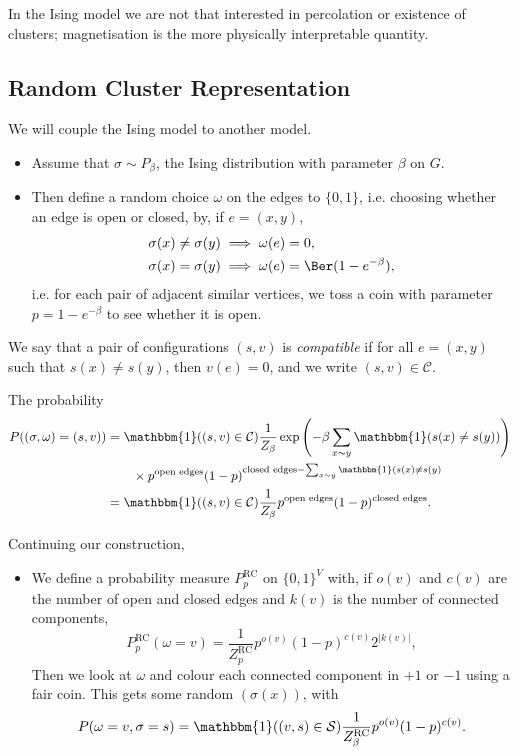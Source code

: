 \documentclass[12pt]{article}
\begin{document}

In the Ising model we are not that interested in percolation or existence of clusters; magnetisation is the more physically interpretable quantity.

\subsection{Random Cluster Representation}%
\label{sub:rcr}

We will couple the Ising model to another model.
\begin{itemize}
	\item Assume that $\sigma \sim P_\beta$, the Ising distribution with parameter $\beta$ on $G$.
	\item Then define a random choice $\omega$ on the edges to $\{0, 1\}$, i.e. choosing whether an edge is open or closed, by, if $e = (x, y)$,
		\begin{align*}
			\sigma(x) \neq \sigma(y) &\implies \omega(e) = 0, \\
		\sigma(x) = \sigma(y) &\implies \omega(e) = \Ber(1 - e^{-\beta}),
		\end{align*}
		i.e. for each pair of adjacent similar vertices, we toss a coin with parameter $p = 1 - e^{-\beta}$ to see whether it is open.
\end{itemize}

We say that a pair of configurations $(s, v)$ is \emph{compatible} if for all $e = (x, y)$ such that $s(x) \neq s(y)$, then $v(e) = 0$, and we write $(s, v) \in \mathcal{C}$.

The probability
\begin{align*}
	P((\sigma, \omega) = (s, v)) &= \mathbbm{1}((s, v) \in \mathcal{C}) \frac{1}{Z_\beta} \exp \left( - \beta \sum_{x \sim y} \mathbbm{1}(s(x) \neq s(y)) \right) \\
				     & \qquad \times p^{\text{open edges}} (1-p)^{\text{closed edges} - \sum_{x \sim y} \mathbbm{1}(s(x) \neq s(y)} \\
				     &= \mathbbm{1}((s, v) \in \mathcal{C}) \frac{1}{Z_\beta} p^{\text{open edges}} (1 - p)^{\text{closed edges}}.
\end{align*}

Continuing our construction,
\begin{itemize}
	\item We define a probability measure $P_p^{\mathrm{RC}}$ on $\{0, 1\}^{V}$ with, if $o(v)$ and $c(v)$ are the number of open and closed edges and $k(v)$ is the number of connected components,
		\[
		P_p^{\mathrm{RC}}(\omega = v) = \frac{1}{Z_p^{\mathrm{RC}}} p^{o(v)} (1 - p)^{c(v)} 2^{|k(v)|},
		\]
		Then we look at $\omega$ and colour each connected component in $+1$ or $-1$ using a fair coin. This gets some random $(\sigma(x))$, with
		\[
		P(\omega = v, \sigma = s) = \mathbbm{1}((v, s) \in \mathcal{S}) \frac{1}{Z_\beta^{\mathrm{RC}}} p^{o(v)} (1 - p)^{c(v)}.
		\]
\end{itemize}
\end{document}

